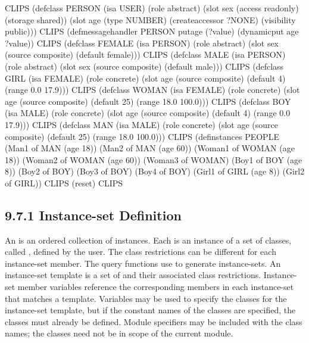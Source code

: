 \documentclass[letterpaper,10pt,english]{sphinxmanual}
\begin{document}
\begin{sphinxVerbatim}[commandchars=\\\{\}]
CLIPS\PYGZgt{}
(defclass PERSON (is\PYGZhy{}a USER)
  (role abstract)
  (slot sex (access read\PYGZhy{}only)
  (storage shared))
  (slot age (type NUMBER)
  (create\PYGZhy{}accessor ?NONE)
  (visibility public)))
CLIPS\PYGZgt{}
(defmessage\PYGZhy{}handler PERSON put\PYGZhy{}age (?value)
  (dynamic\PYGZhy{}put age ?value))
CLIPS\PYGZgt{}
(defclass FEMALE (is\PYGZhy{}a PERSON)
  (role abstract)
  (slot sex (source composite)
  (default female)))
CLIPS\PYGZgt{}
(defclass MALE (is\PYGZhy{}a PERSON)
  (role abstract)
  (slot sex (source composite)
  (default male)))
CLIPS\PYGZgt{}
(defclass GIRL (is\PYGZhy{}a FEMALE)
  (role concrete)
  (slot age (source composite)
  (default 4)
  (range 0.0 17.9)))
CLIPS\PYGZgt{}
(defclass WOMAN (is\PYGZhy{}a FEMALE)
  (role concrete)
  (slot age (source composite)
  (default 25)
  (range 18.0 100.0)))
CLIPS\PYGZgt{}
(defclass BOY (is\PYGZhy{}a MALE)
  (role concrete)
  (slot age (source composite)
  (default 4)
  (range 0.0 17.9)))
CLIPS\PYGZgt{}
(defclass MAN (is\PYGZhy{}a MALE)
  (role concrete)
  (slot age (source composite)
  (default 25)
  (range 18.0 100.0)))
CLIPS\PYGZgt{}
(definstances PEOPLE
  (Man\PYGZhy{}1 of MAN (age 18))
  (Man\PYGZhy{}2 of MAN (age 60))
  (Woman\PYGZhy{}1 of WOMAN (age 18))
  (Woman\PYGZhy{}2 of WOMAN (age 60))
  (Woman\PYGZhy{}3 of WOMAN)
  (Boy\PYGZhy{}1 of BOY (age 8))
  (Boy\PYGZhy{}2 of BOY)
  (Boy\PYGZhy{}3 of BOY)
  (Boy\PYGZhy{}4 of BOY)
  (Girl\PYGZhy{}1 of GIRL (age 8))
  (Girl\PYGZhy{}2 of GIRL))
CLIPS\PYGZgt{} (reset)
CLIPS\PYGZgt{}
\end{sphinxVerbatim}


\subsection{9.7.1 Instance-set Definition}
\label{\detokenize{cool:instance-set-definition}}
An  is an ordered collection of instances. Each
 is an instance of a set of classes, called
, defined by the user. The class restrictions can
be different for each instance-set member. The query functions use
 to generate instance-sets. An instance-set
template is a set of  and their
associated class restrictions. Instance-set member variables reference
the corresponding members in each instance-set that matches a template.
Variables may be used to specify the classes for the instance-set
template, but if the constant names of the classes are specified, the
classes must already be defined. Module specifiers may be included with
the class names; the classes need not be in scope of the current module.
\end{document}
